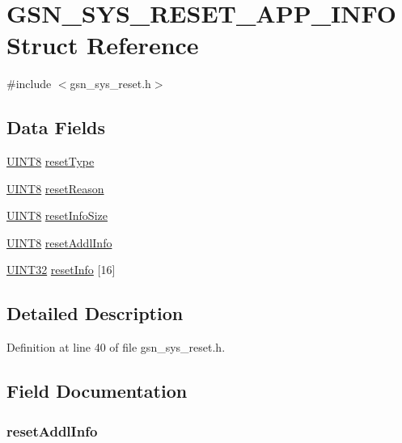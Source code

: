 \hypertarget{a00256}{
\section{GSN\_\-SYS\_\-RESET\_\-APP\_\-INFO Struct Reference}
\label{a00256}
}


{\ttfamily \#include $<$gsn\_\-sys\_\-reset.h$>$}

\subsection*{Data Fields}
\begin{DoxyCompactItemize}
\item 
\hyperlink{a00660_gab27e9918b538ce9d8ca692479b375b6a}{UINT8} \hyperlink{a00256_a424379d8fb70c92b5ebe7450172ed356}{resetType}
\item 
\hyperlink{a00660_gab27e9918b538ce9d8ca692479b375b6a}{UINT8} \hyperlink{a00256_a860e10ca47301c26f0cc214d9aaa74b9}{resetReason}
\item 
\hyperlink{a00660_gab27e9918b538ce9d8ca692479b375b6a}{UINT8} \hyperlink{a00256_af784980100bfb4e57308fee9850b394b}{resetInfoSize}
\item 
\hyperlink{a00660_gab27e9918b538ce9d8ca692479b375b6a}{UINT8} \hyperlink{a00256_a4f1bb86c841d8dfc393b4d39190d81e1}{resetAddlInfo}
\item 
\hyperlink{a00660_gae1e6edbbc26d6fbc71a90190d0266018}{UINT32} \hyperlink{a00256_ab5521c89f8f524c9a3e9fa8e6591b9f8}{resetInfo} \mbox{[}16\mbox{]}
\end{DoxyCompactItemize}


\subsection{Detailed Description}


Definition at line 40 of file gsn\_\-sys\_\-reset.h.



\subsection{Field Documentation}
\hypertarget{a00256_a4f1bb86c841d8dfc393b4d39190d81e1}{
\subsubsection[{resetAddlInfo}]{ {\bf resetAddlInfo}}}
\label{a00256_a4f1bb86c841d8dfc393b4d39190d81e1}


